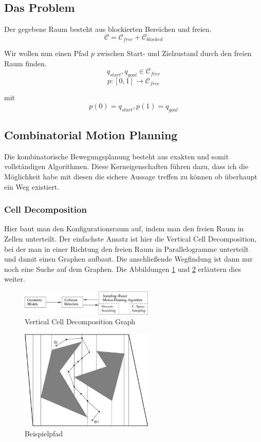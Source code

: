 \documentclass[journal]{IEEEtran}
\begin{document}
\subsection{Das Problem}
Der gegebene Raum besteht aus blockierten Bereichen und freien.
\[\mathcal C = \mathcal C_{free} + \mathcal C_{blocked}\]

Wir wollen nun einen Pfad $p$ zwischen Start- und Zielzustand durch den freien Raum finden.
\[q_{start},q_{goal}\in \mathcal C_{free}\]
\[p:[0,1]\rightarrow \mathcal C_{free}\]

mit
\[p(0)=q_{start},p(1)=q_{goal}\]\cite{tsk07}
\subsection{Combinatorial Motion Planning}
Die kombinatorische Bewegungsplanung besteht aus exakten und somit vollständigen Algorithmen. Diese Kerneigenschaften führen dazu, dass ich die Möglichkeit habe mit diesen die sichere Aussage treffen zu können ob überhaupt ein Weg existiert. 
\cite{lavalle06}
\cite{tsk07}
\subsubsection{Cell Decomposition}
Hier baut man den Konfigurationsraum auf, indem man den freien Raum in Zellen unterteilt. Der einfachste Ansatz ist hier die Vertical Cell Decomposition, bei der man in einer Richtung den freien Raum in Parallelogramme unterteilt und damit einen Graphen aufbaut. Die anschließende Wegfindung ist dann nur noch eine Suche auf dem Graphen. Die Abbildungen \ref{cell1} und \ref{cell2} erläutern dies weiter.
\cite{lavalle06}
\begin{figure}[!t]
\centering
\includegraphics[width=2.5in]{img2115}
\caption{Vertical Cell Decomposition Graph}
\label{cell1}
\end{figure}
\begin{figure}[!t]
\centering
\includegraphics[width=2.5in]{img2116}
\caption{Beispielpfad}
\label{cell2}
\end{figure}
\end{document}
